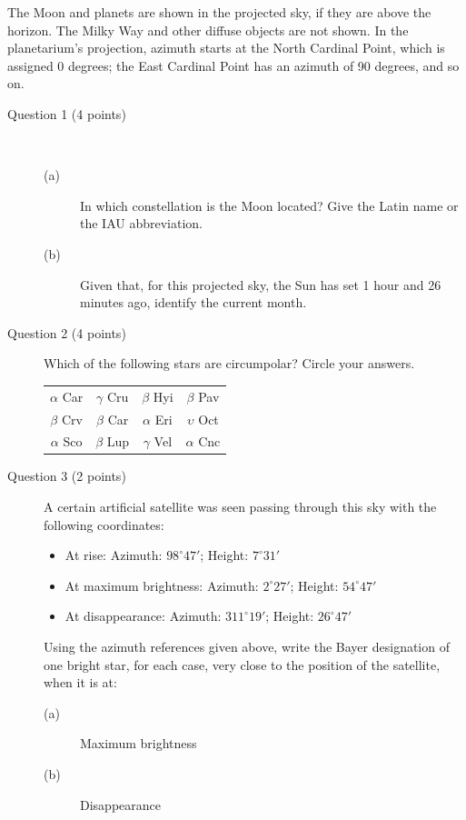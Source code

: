 The Moon and planets are shown in the projected sky, if they are above the
horizon. The Milky Way and other diffuse objects are not shown. In the
planetarium's projection, azimuth starts at the North Cardinal Point, which
is assigned 0 degrees; the East Cardinal Point has an azimuth of 90 degrees,
and so on.

\begin{description}
\item[Question 1 (4 points)]~
  \begin{description}
  \item[(a)] In which constellation is the Moon located? Give the Latin name
    or the IAU abbreviation.
  \item[(b)] Given that, for this projected sky, the Sun has set 1 hour and
    26 minutes ago, identify the current month.
  \end{description}
\item[Question 2 (4 points)] Which of the following stars are circumpolar?
  Circle your answers.

  \begin{center}
  \begin{tabular}{cccc}
  $\alpha$ Car & $\gamma$ Cru & $\beta$ Hyi & $\beta$ Pav \\
  $\beta$ Crv & $\beta$ Car & $\alpha$ Eri & $\upsilon$ Oct \\
  $\alpha$ Sco & $\beta$ Lup & $\gamma$ Vel & $\alpha$ Cnc \\
  \end{tabular}
  \end{center}
\item[Question 3 (2 points)] A certain artificial satellite was seen passing
  through this sky with the following coordinates:
  \begin{itemize}
  \item At rise: Azimuth: $98^\circ 47'$; Height: $7^\circ 31'$
  \item At maximum brightness: Azimuth: $2^\circ 27'$; Height:
    $54^\circ 47'$
  \item At disappearance: Azimuth: $311^\circ 19'$; Height: $26^\circ 47'$
  \end{itemize}
  Using the azimuth references given above, write the Bayer designation of
  one bright star, for each case, very close to the position of the
  satellite, when it is at:
  \begin{description}
  \item[(a)] Maximum brightness
  \item[(b)] Disappearance
  \end{description}
\end{description}
